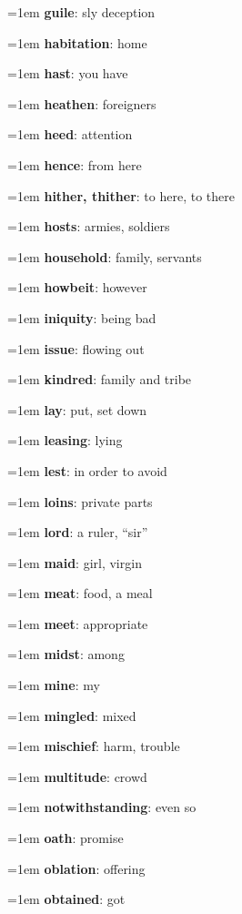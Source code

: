 {\begin{multicols}{3}
{\hangindent=1em \textbf{guile}: sly deception\par
\hangindent=1em \textbf{habitation}: home\par
\hangindent=1em \textbf{hast}: you have\par
\hangindent=1em \textbf{heathen}: foreigners\par
\hangindent=1em \textbf{heed}: attention\par
\hangindent=1em \textbf{hence}: from here\par
\hangindent=1em \textbf{hither, thither}: to here, to there\par
\hangindent=1em \textbf{hosts}: armies, soldiers\par
\hangindent=1em \textbf{household}: family, servants\par
\hangindent=1em \textbf{howbeit}: however\par
\hangindent=1em \textbf{iniquity}: being bad\par
\hangindent=1em \textbf{issue}: flowing out\par
\hangindent=1em \textbf{kindred}: family and tribe\par
\hangindent=1em \textbf{lay}: put, set down\par
\hangindent=1em \textbf{leasing}: lying\par
\hangindent=1em \textbf{lest}: in order to avoid\par
\hangindent=1em \textbf{loins}: private parts\par
\hangindent=1em \textbf{lord}: a ruler, “sir”\par
\hangindent=1em \textbf{maid}: girl, virgin\par
\hangindent=1em \textbf{meat}: food, a meal\par
\hangindent=1em \textbf{meet}: appropriate\par
\hangindent=1em \textbf{midst}: among\par
\hangindent=1em \textbf{mine}: my\par
\hangindent=1em \textbf{mingled}: mixed\par
\hangindent=1em \textbf{mischief}: harm, trouble\par
\hangindent=1em \textbf{multitude}: crowd\par
\hangindent=1em \textbf{notwithstanding}: even so\par
\hangindent=1em \textbf{oath}: promise\par
\hangindent=1em \textbf{oblation}: offering\par
\hangindent=1em \textbf{obtained}: got\par
}
\end{multicols}}
